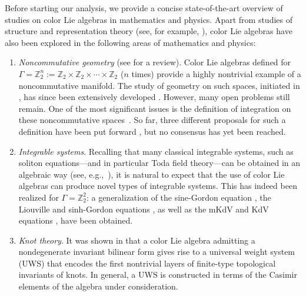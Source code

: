 \documentclass[pdftex]{sigma}
\numberwithin{equation}{section}
\theoremstyle{definition}
\def\Z2{\mathbb{Z}_2^2}
\begin{document}
Before starting our analysis, we provide a concise state-of-the-art overview of studies on color Lie algebras in mathematics and physics.
Apart from studies of structure and representation theory (see, for example, \cite{IsStVdJ,KuToclassification,SilvCoho,RyanRefining,SchZhang,Stclassical,StG2}), color Lie algebras have also been explored in the following areas of mathematics and physics:
\begin{enumerate}\itemsep=0pt
\item[(i)] \emph{Noncommutative geometry} (see \cite{PonSch} for a review).
Color Lie algebras defined for $ \Gamma = \mathbb{Z}_2^n := \mathbb{Z}_2 \times \mathbb{Z}_2 \times \cdots \times \mathbb{Z}_2 $ ($n$ times) provide a highly nontrivial example of a noncommutative manifold. The study of geometry on such spaces, initiated in \cite{Covolo,CoGrPo,CoGrPo2012}, has since been extensively developed \cite{BruIb,BruPon,bruce2019products,CoGrPo2016,CoKwoPo,MoVar}.
However, many open problems still remain. One of the most significant issues is the definition of integration on these noncommutative spaces~\cite{Poncin}.
So far, three different proposals for such a definition have been put forward \cite{AiItoIntegral, Poncin,PonSch}, but no consensus has yet been reached.

\item[(ii)] \emph{Integrable systems}.
Recalling that many classical integrable systems, such as soliton equations—and in particular Toda field theory—can be obtained in an algebraic way (see, e.g.,~\cite{BBTbook}), it is natural to expect that the use of color Lie algebras can produce novel types of integrable systems.
This has indeed been realized for $\Gamma = \Z2$: a generalization of the sine-Gordon equation \cite{BruSG}, the Liouville and sinh-Gordon equations \cite{AFITTsuper, AIKTTslint}, as well as the mKdV and KdV equations \cite{AiFujiIto}, have been obtained.

\item[(iii)] \emph{Knot theory}.
It was shown in \cite{AiKimura} that a color Lie algebra admitting a nondegenerate invariant bilinear form gives rise to a universal weight system (UWS) that encodes the first nontrivial layers of finite-type topological invariants of knots.
In general, a UWS is constructed in terms of the Casimir elements of the algebra under consideration.


\end{enumerate}
\end{document}
